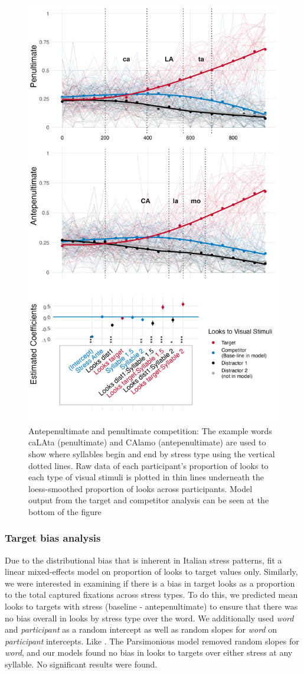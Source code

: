 \begin{figure}[H]
  \centering
  \includegraphics[width=0.6\linewidth]{visuals/pen_vs_anti_pen_id_combo.jpeg} %
  \caption{Antepenultimate and penultimate competition: The example words caLAta (penultimate) and CAlamo (antepenultimate) are used to show where syllables begin and end by stress type using the vertical dotted lines. Raw data of each participant's proportion of looks to each type of visual stimuli is plotted in thin lines underneath the loess-smoothed proportion of looks across participants. Model output from the target and competitor analysis can be seen at the bottom of the figure}
  \label{fig:raw_pen_vs_anti}
\end{figure}

\subsubsection{Target bias analysis}

Due to the distributional bias that is inherent in Italian stress patterns, \cite{Sulpizio_McQueen_2012} fit a linear mixed-effects model on proportion of looks to target values only. Similarly, we were interested in examining if there is a bias in target looks as a proportion to the total captured fixations across stress types. To do this, we predicted mean looks to targets with stress (baseline - antepenultimate) to ensure that there was no bias overall in looks by stress type over the word. We additionally used \textit{word} and \textit{participant} as a random intercept as well as random slopes for \textit{word} on \textit{participant} intercepts. Like \cite{Sulpizio_McQueen_2012}. The Parsimonious model removed random slopes for \textit{word}, and our models found no bias in looks to targets over either stress at any syllable. No significant results were found.   


